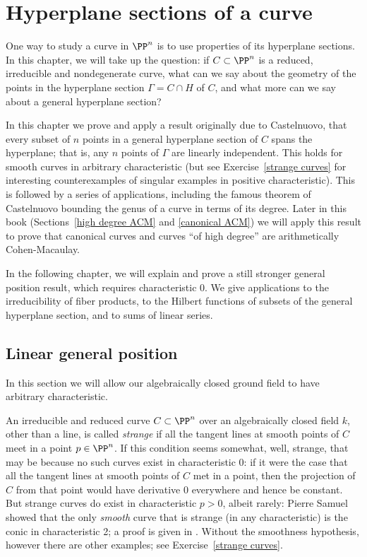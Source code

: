 


\chapter{Hyperplane sections of a curve}\label{linear general position chapter}

One way to study a curve in $\PP^n$ is to use properties of its hyperplane sections. In this chapter, we will take up the question: if $C \subset \PP^n$ is a reduced, irreducible and nondegenerate curve, what can we say about the geometry of the points in the  hyperplane section $\Gamma = C \cap H$ of $C$, and what more can we say about a general hyperplane section?

In this chapter we prove and apply a result originally due to Castelnuovo, that every subset of $n$ points in a
general hyperplane section of $C$ spans the hyperplane; that is, any $n$ points of $\Gamma$ are linearly independent. This 
holds for smooth curves in arbitrary characteristic (but see Exercise~\ref{strange curves} for
interesting counterexamples of singular examples in positive characteristic). This is followed by a series of applications,
including the famous theorem of Castelnuovo bounding the genus of a curve in terms of its degree. Later in this
book (Sections~\ref{high degree ACM} and \ref{canonical ACM}) we will apply this result to prove that canonical curves and 
curves ``of high degree'' are arithmetically Cohen-Macaulay.

In the following chapter, we will explain and prove a still stronger general position result, which requires characteristic 0. We give applications to the irreducibility of fiber products, to the Hilbert functions of subsets of the
general hyperplane section, and to sums of linear series.


\section{Linear general position}
In this section we will allow our algebraically closed ground field to have arbitrary characteristic. 

An irreducible and reduced curve
$C\subset \PP^n$ over an algebraically closed field $k$, other than a line, is called \emph{strange} if
all the tangent lines at smooth points of $C$ meet in a point $p\in \PP^n$. If this condition seems somewhat, well, strange, that may be because no such curves exist in characteristic 0: if it were the case that all the tangent lines at smooth points of $C$ met in a point, then the projection of $C$ from that point would have derivative 0 everywhere and hence be constant. But strange curves do exist in characteristic $p > 0$, albeit rarely: Pierre Samuel showed that the only \emph{smooth} curve that is strange (in any characteristic) is the conic in characteristic 2; a proof is given in \cite[Theorem IV.3.9]{Hartshorne1977}. Without the smoothness hypothesis, however there are other examples; see Exercise~\ref{strange curves}.

